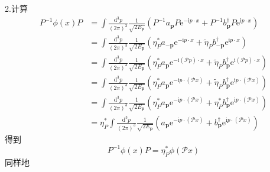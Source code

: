 2.计算
\begin{equation}
    \begin{aligned}
        P^{-1}\phi (x)P&=\int{\frac{\mathrm{d}^3p}{\left( 2\pi \right) ^3}}\frac{1}{\sqrt{2E_{\mathbf{p}}}}\left( P^{-1}a_{\mathbf{p}}P\mathrm{e}^{-\mathrm{i}p\cdot x}+P^{-1}b_{\mathbf{p}}^{\dagger}P\mathrm{e}^{\mathrm{i}p\cdot x} \right) 
\\
&=\int{\frac{\mathrm{d}^3p}{\left( 2\pi \right) ^3}}\frac{1}{\sqrt{2E_{\mathbf{p}}}}\left( \eta _{P}^{*}a_{-\mathbf{p}}\mathrm{e}^{-\mathrm{i}p\cdot x}+\tilde{\eta}_Pb_{-\mathbf{p}}^{\dagger}\mathrm{e}^{\mathrm{i}p\cdot x} \right) 
\\
&=\int{\frac{\mathrm{d}^3p}{\left( 2\pi \right) ^3}}\frac{1}{\sqrt{2E_{\mathbf{p}}}}\left( \eta _{P}^{*}a_{\mathbf{p}}\mathrm{e}^{-\mathrm{i}\left( \mathcal{P} p \right) \cdot x}+\tilde{\eta}_Pb_{\mathbf{p}}^{\dagger}\mathrm{e}^{\mathrm{i}\left( \mathcal{P} p \right) \cdot x} \right) 
\\
&=\int{\frac{\mathrm{d}^3p}{\left( 2\pi \right) ^3}}\frac{1}{\sqrt{2E_{\mathbf{p}}}}\left( \eta _{P}^{*}a_{\mathbf{p}}\mathrm{e}^{-\mathrm{i}p\cdot \left( \mathcal{P} x \right)}+\tilde{\eta}_Pb_{\mathbf{p}}^{\dagger}\mathrm{e}^{\mathrm{i}p\cdot \left( \mathcal{P} x \right)} \right) 
\\
&=\int{\frac{\mathrm{d}^3p}{\left( 2\pi \right) ^3}}\frac{1}{\sqrt{2E_{\mathbf{p}}}}\left( \eta _{P}^{*}a_{\mathbf{p}}\mathrm{e}^{-\mathrm{i}p\cdot \left( \mathcal{P} x \right)}+\eta _{P}^{*}b_{\mathbf{p}}^{\dagger}\mathrm{e}^{\mathrm{i}p\cdot \left( \mathcal{P} x \right)} \right) 
\\
&=\eta _{P}^{*}\int{\frac{\mathrm{d}^3p}{\left( 2\pi \right) ^3}}\frac{1}{\sqrt{2E_{\mathbf{p}}}}\left( a_{\mathbf{p}}\mathrm{e}^{-\mathrm{i}p\cdot \left( \mathcal{P} x \right)}+b_{\mathbf{p}}^{\dagger}\mathrm{e}^{\mathrm{i}p\cdot \left( \mathcal{P} x \right)} \right) 
    \end{aligned}
\end{equation}
得到
\begin{equation}
    P^{-1}\phi (x)P=\eta _{P}^{*}\phi (\mathcal{P} x)
\end{equation}
同样地
